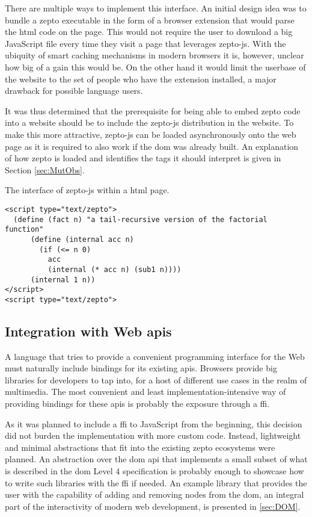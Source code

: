 \documentclass[oneside,11pt,xetex]{scrbook}
\begin{document}
There are multiple ways to implement this interface. An initial design idea was to
bundle a zepto executable in the form of a browser extension that would parse the
\gls{html} code on the page. This would not require the user to download a big JavaScript
file every time they visit a page that leverages zepto-js. With the ubiquity of
smart caching mechanisms in modern browsers it is, however, unclear how big of
a gain this would be. On the other hand it would limit the userbase of the website
to the set of people who have the extension installed, a major drawback for possible
language users.

It was thus determined that the prerequisite for being able to embed zepto code into
a website should be to include the zepto-js distribution in the website. To make
this more attractive, zepto-js can be loaded asynchronously onto the web page as it
is required to also work if the \gls{dom} was already built. An explanation of how
zepto is loaded and identifies the tags it should interpret is given in Section \ref{sec:MutObs}.

\begin{listing}[H]
\caption{The interface of zepto-js within a \gls{html} page.}
\begin{verbatim}
<script type="text/zepto">
  (define (fact n) "a tail-recursive version of the factorial function"
      (define (internal acc n)
        (if (<= n 0)
          acc
          (internal (* acc n) (sub1 n))))
      (internal 1 n))
</script>
<script type="text/zepto">
\end{verbatim}
\label{fig:zpjs}
\end{listing}

\subsection{Integration with Web \glspl{api}}

A language that tries to provide a convenient programming interface for the Web must
naturally include bindings for its existing \glspl{api}. Browsers provide big libraries
for developers to tap into, for a host of different use cases in the realm of multimedia.
The most convenient and least implementation-intensive way of providing bindings for
these \glspl{api} is probably the exposure through a \gls{ffi}.

As it was planned to include a \gls{ffi} to JavaScript from the beginning, this decision
did not burden the implementation with more custom code. Instead, lightweight and minimal
abstractions that fit into the existing zepto ecosystems were planned. An abstraction
over the \gls{dom} \gls{api} that implements a small subset of what is described in
the \gls{dom} Level 4 specification \parencite{DOM4} is probably enough to showcase how to
write such libraries with the \gls{ffi} if needed. An example library that provides the
user with the capability of adding and removing nodes from the \gls{dom}, an integral
part of the interactivity of modern web development, is presented in \ref{sec:DOM}.
\end{document}
